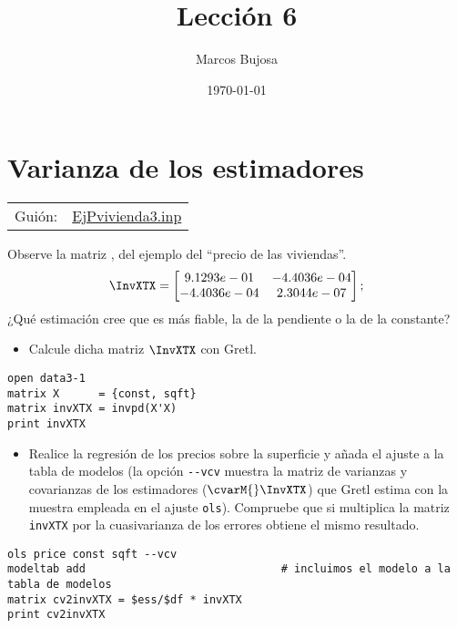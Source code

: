 \documentclass[11pt]{article}
\author{Marcos Bujosa}
\date{\today}
\title{Lección 6}
\begin{document}
\maketitle
\tableofcontents

\clearpage

\section{Varianza de los estimadores}
\label{sec:org5c86503}
\begin{center}
\begin{tabular}{ll}
Guión: & \href{https://github.com/mbujosab/Ectr/tree/master/Practicas/Gretl/scripts/EjPvivienda3.inp}{EjPvivienda3.inp}\\[0pt]
\end{tabular}
\end{center}


Observe la matriz \InvXTX, del ejemplo del ``precio de las viviendas''.
\begin{displaymath}
   \InvXTX=
   \begin{bmatrix}
     9.1293e-01 & -4.4036e-04\\
     -4.4036e-04 & 2.3044e-07
   \end{bmatrix};
\end{displaymath}    
¿Qué estimación cree que es más fiable, la de la pendiente o la de la
constante?

\begin{itemize}
\item Calcule dicha matriz \(\InvXTX\) con Gretl.
\end{itemize}

\begin{verbatim}
open data3-1
matrix X      = {const, sqft}
matrix invXTX = invpd(X'X)
print invXTX 
\end{verbatim}

\begin{itemize}
\item Realice la regresión de los precios sobre la superficie y añada el
ajuste a la tabla de modelos (la opción \texttt{-{}-vcv} muestra la matriz de
varianzas y covarianzas de los estimadores (\(\cvarM{}\InvXTX\)) que
Gretl estima con la muestra empleada en el ajuste \texttt{ols}). Compruebe
que si multiplica la matriz \texttt{invXTX} por la cuasivarianza de los
errores obtiene el mismo resultado.
\end{itemize}
\begin{verbatim}
ols price const sqft --vcv
modeltab add                              # incluimos el modelo a la tabla de modelos
matrix cv2invXTX = $ess/$df * invXTX 
print cv2invXTX
\end{verbatim}
\end{document}
